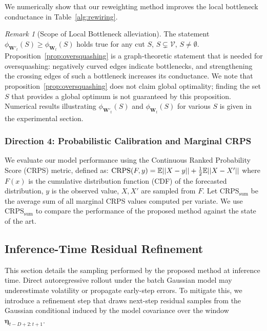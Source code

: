 \documentclass{article}
\theoremstyle{plain}
\theoremstyle{definition}
\theoremstyle{remark}
\newtheorem{remark}[theorem]{Remark}
\begin{document}
We numerically show that our reweighting method improves the local bottleneck conductance in Table~\ref{alg:rewiring}. 

\begin{remark}[Scope of Local Bottleneck alleviation]
\label{rem:bfc-cheeger}
The statement $\phi_{\mathbf W'_t}(S)\ge \phi_{\mathbf W_t}(S)$ holds true for any cut $S$, $S\subsetneq\mathcal V$, $S\neq\emptyset$. Proposition~\ref{prop:oversquashing}
is a graph-theoretic
statement that is needed for oversquashing: negatively curved edges
indicate bottlenecks, and strengthening the crossing edges of such a bottleneck
increases its conductance. We note that proposition~\ref{prop:oversquashing} does not claim global optimality; finding the set $S$ that provides a global optimum is not guaranteed by this proposition. Numerical results illustrating $\phi_{\mathbf W'_t}(S)$ and $ \phi_{\mathbf W_t}(S)$ for various $S$ is given in the experimental section.
\end{remark}


\subsubsection{Direction 4: Probabilistic Calibration and Marginal CRPS}
\label{sssec:crps}



We evaluate our model performance using the Continuous Ranked Probability Score (CRPS) metric, defined as: $\small{
\mathrm{CRPS}(F, y) = \mathbb{E} ||X - y|| + \frac{1}{2} \mathbb{E} ||X - X'||}$ where $F(x)$ is the cumulative distribution function (CDF) of the forecasted distribution, $y$ is the observed value, $X,X'$ are sampled from $F$.  Let $\mathrm{CRPS}_{\mathrm{sum}}$ be the average sum of all marginal CRPS values computed per variate.   We use $\mathrm{CRPS}_{\mathrm{sum}}$ to compare the performance of the proposed method against the state of the art. 


\subsection{Inference-Time Residual Refinement}
\label{ssec:refinement}

This section details the sampling performed by the proposed method at inference time.  Direct autoregressive rollout under the batch Gaussian model may
underestimate volatility or propagate early-step errors. To mitigate this,
we introduce a refinement step that draws next-step residual samples from the
Gaussian conditional induced by the model covariance over the window
$\boldsymbol{\eta}_{t-D+2:t+1}$.
\end{document}
